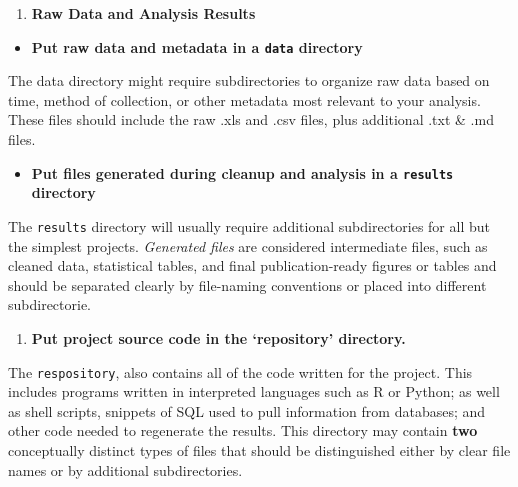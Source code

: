 \documentclass[
]{book}
\providecommand{\tightlist}{%
  \setlength{\itemsep}{0pt}\setlength{\parskip}{0pt}}
\begin{document}
\begin{enumerate}
\def\labelenumi{\arabic{enumi}.}
\setcounter{enumi}{2}
\tightlist
\item
  \textbf{Raw Data and Analysis Results}
\end{enumerate}

\begin{itemize}
\tightlist
\item
  \textbf{Put raw data and metadata in a \texttt{data} directory}
\end{itemize}

The data directory might require subdirectories to organize raw data based on time, method of collection, or other metadata most relevant to your analysis. These files should include the raw .xls and .csv files, plus additional .txt \& .md files.

\begin{itemize}
\tightlist
\item
  \textbf{Put files generated during cleanup and analysis in a \texttt{results} directory}
\end{itemize}

The \texttt{results} directory will usually require additional subdirectories for all but the simplest projects. \emph{Generated files} are considered intermediate files, such as cleaned data, statistical tables, and final publication-ready figures or tables and should be separated clearly by file-naming conventions or placed into different subdirectorie.

\begin{enumerate}
\def\labelenumi{\arabic{enumi}.}
\setcounter{enumi}{3}
\tightlist
\item
  \textbf{Put project source code in the `repository' directory.}
\end{enumerate}

The \texttt{respository}, also contains all of the code written for the project. This includes programs written in interpreted languages such as R or Python; as well as shell scripts, snippets of SQL used to pull information from databases; and other code needed to regenerate the results.
This directory may contain \textbf{two} conceptually distinct types of files that should be distinguished either by clear file names or by additional subdirectories.
\end{document}
